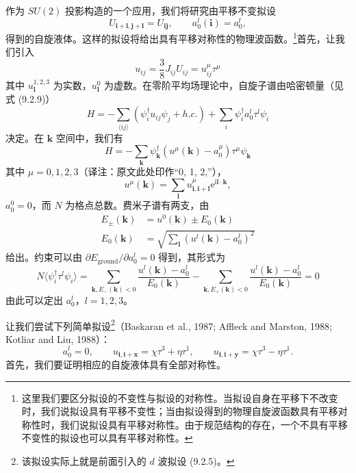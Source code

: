 作为 $SU(2)$ 投影构造的一个应用，我们将研究由平移不变拟设
\begin{equation*}
U_{\pmb{i}+\pmb{l},\pmb{j}+\pmb{l}}=U_{\pmb{i}\pmb{j}},\qquad a_0^{l}(\pmb{i})=a_0^{l},
\end{equation*}
得到的自旋液体。这样的拟设将给出具有平移对称性的物理波函数。\footnote{这里我们要区分拟设的不变性与拟设的对称性。当拟设自身在平移下不改变时，我们说拟设具有平移不变性；当由拟设得到的物理自旋波函数具有平移对称性时，我们说拟设具有平移对称性。由于规范结构的存在，一个不具有平移不变性的拟设也可以具有平移对称性。}首先，让我们引入
\begin{equation*}
u_{ij}=\frac{3}{8}J_{ij}U_{ij}=u_{ij}^{\mu}\tau^{\mu}
\end{equation*}
其中 $u_{\pmb{l}}^{1,2,3}$ 为实数，$u_{\pmb{l}}^{0}$ 为虚数。在零阶平均场理论中，自旋子谱由哈密顿量（见式 (9.2.9)）
\begin{equation*}
H=-\sum_{\langle ij\rangle}\left(\psi_i^{\dagger}u_{ij}\psi_j+h.c.\right)+\sum_i\psi_i^{\dagger}a_0^{l}\tau^{l}\psi_i
\tag{9.2.27}
\end{equation*}
决定。在 $\pmb{k}$ 空间中，我们有
\begin{equation*}
H=-\sum_{\pmb{k}}\psi_{\pmb{k}}^{\dagger}(u^{\mu}(\pmb{k})-a_0^{\mu})\tau^{\mu}\psi_{\pmb{k}}
\end{equation*}
其中 $\mu=0,1,2,3$（译注：原文此处印作“0, 1, 2,”），
\begin{equation*}
u^{\mu}(\pmb{k})=\sum_{\pmb{l}}u_{\pmb{i},\pmb{i}+\pmb{l}}^{\mu}\mathrm{e}^{\mathrm{i}\pmb{l}\cdot\pmb{k}},
\end{equation*}
$a_0^{0}=0$，而 $N$ 为格点总数。费米子谱有两支，由
\begin{align*}
E_{\pm}(\pmb{k})&=u^{0}(\pmb{k})\pm E_0(\pmb{k})\\
E_0(\pmb{k})&=\sqrt{\sum_{\pmb{l}}(u^{l}(\pmb{k})-a_0^{l})^{2}}
\tag{9.2.28}
\end{align*}
给出。约束可以由 $\partial E_{\mathrm{ground}}/\partial a_0^{l}=0$ 得到，其形式为
\begin{equation*}
N\langle\psi_i^{\dagger}\tau^{l}\psi_i\rangle=\sum_{\pmb{k},E_-(\pmb{k})<0}\frac{u^{l}(\pmb{k})-a_0^{l}}{E_0(\pmb{k})}-\sum_{\pmb{k},E_+(\pmb{k})<0}\frac{u^{l}(\pmb{k})-a_0^{l}}{E_0(\pmb{k})}=0
\tag{9.2.29}
\end{equation*}
由此可以定出 $a_0^{l}$，$l=1,2,3$。

让我们尝试下列简单拟设\footnote{该拟设实际上就是前面引入的 $d$ 波拟设 (9.2.5)。}（Baskaran et al., 1987; Affleck and Marston, 1988; Kotliar and Liu, 1988）：
\begin{equation*}
a_0^{l}=0,\qquad u_{\pmb{i},\pmb{i}+\pmb{x}}=\chi\tau^{3}+\eta\tau^{1},\qquad u_{\pmb{i},\pmb{i}+\pmb{y}}=\chi\tau^{3}-\eta\tau^{1}.
\tag{9.2.30}
\end{equation*}
首先，我们要证明相应的自旋液体具有全部对称性。

